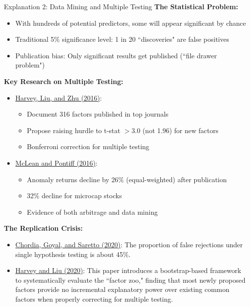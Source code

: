 \documentclass{beamer}
\begin{document}
\begin{frame}[allowframebreaks]{Explanation 2: Data Mining and Multiple Testing}
    \textbf{The Statistical Problem:}
    \begin{itemize}
        \item With hundreds of potential predictors, some will appear significant by chance
        \item Traditional 5\% significance level: 1 in 20 ``discoveries" are false positives
        \item Publication bias: Only significant results get published (``file drawer problem")
    \end{itemize}
    
    \vspace{0.3cm}
    \textbf{Key Research on Multiple Testing:}
    \begin{itemize}
        \item \textcolor{blue}{\href{https://doi.org/10.1093/rfs/hhv059}{Harvey, Liu, and Zhu (2016)}}:
        \begin{itemize}
            \item Document 316 factors published in top journals
            \item Propose raising hurdle to t-stat $> 3.0$ (not 1.96) for new factors
            \item Bonferroni correction for multiple testing
        \end{itemize}
        \item \textcolor{blue}{\href{https://doi.org/10.1111/jofi.12365}{McLean and Pontiff (2016)}}:
        \begin{itemize}
            \item Anomaly returns decline by 26\% (equal-weighted) after publication
            \item 32\% decline for microcap stocks
            \item Evidence of both arbitrage and data mining
        \end{itemize}
    \end{itemize}

    \textbf{The Replication Crisis:}
    \begin{itemize}
        \item \textcolor{blue}{\href{https://doi.org/10.1093/rfs/hhaa018}{Chordia, Goyal, and Saretto (2020)}}: The proportion of false rejections under single hypothesis testing is about 45\%.
        \item \textcolor{blue}{\href{https://doi.org/10.1111/jofi.12951}{Harvey and Liu (2020)}}: This paper introduces a bootstrap-based framework to systematically evaluate the ``factor zoo," finding that most newly proposed factors provide no incremental explanatory power over existing common factors when properly correcting for multiple testing.
    \end{itemize}
\end{frame}
\end{document}
